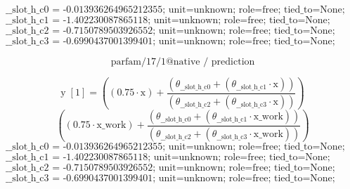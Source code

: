 \[\text{\_\_slot\_h\_c0 = -0.013936264965212355; unit=unknown; role=free; tied\_to=None; bounds=[None, None]; origin=native\_coefficient\_block}\]
\[\text{\_\_slot\_h\_c1 = -1.402230087865118; unit=unknown; role=free; tied\_to=None; bounds=[None, None]; origin=native\_coefficient\_block}\]
\[\text{\_\_slot\_h\_c2 = -0.7150789503926552; unit=unknown; role=free; tied\_to=None; bounds=[None, None]; origin=native\_normalized\_denominator\_coordinate}\]
\[\text{\_\_slot\_h\_c3 = -0.6990437001399401; unit=unknown; role=free; tied\_to=None; bounds=[None, None]; origin=native\_normalized\_denominator\_coordinate}\]
\noindent {}\par
\noindent {}\par
\noindent {}\par
\noindent {}\par
\[\text{parfam/17/1@native / prediction}\]
\noindent {}\par
\[\text{y}\;[\text{1}] = \left(\left(0.75 \cdot \text{x}\right) + \frac{\left(\theta_{\text{\_\_slot\_h\_c0}} + \left(\theta_{\text{\_\_slot\_h\_c1}} \cdot \text{x}\right)\right)}{\left(\theta_{\text{\_\_slot\_h\_c2}} + \left(\theta_{\text{\_\_slot\_h\_c3}} \cdot \text{x}\right)\right)}\right)\]
\[\left(\left(0.75 \cdot \text{x\_work}\right) + \frac{\left(\theta_{\text{\_\_slot\_h\_c0}} + \left(\theta_{\text{\_\_slot\_h\_c1}} \cdot \text{x\_work}\right)\right)}{\left(\theta_{\text{\_\_slot\_h\_c2}} + \left(\theta_{\text{\_\_slot\_h\_c3}} \cdot \text{x\_work}\right)\right)}\right)\]
\[\text{\_\_slot\_h\_c0 = -0.013936264965212355; unit=unknown; role=free; tied\_to=None; bounds=[None, None]; origin=native\_coefficient\_block}\]
\[\text{\_\_slot\_h\_c1 = -1.402230087865118; unit=unknown; role=free; tied\_to=None; bounds=[None, None]; origin=native\_coefficient\_block}\]
\[\text{\_\_slot\_h\_c2 = -0.7150789503926552; unit=unknown; role=free; tied\_to=None; bounds=[None, None]; origin=native\_normalized\_denominator\_coordinate}\]
\[\text{\_\_slot\_h\_c3 = -0.6990437001399401; unit=unknown; role=free; tied\_to=None; bounds=[None, None]; origin=native\_normalized\_denominator\_coordinate}\]
